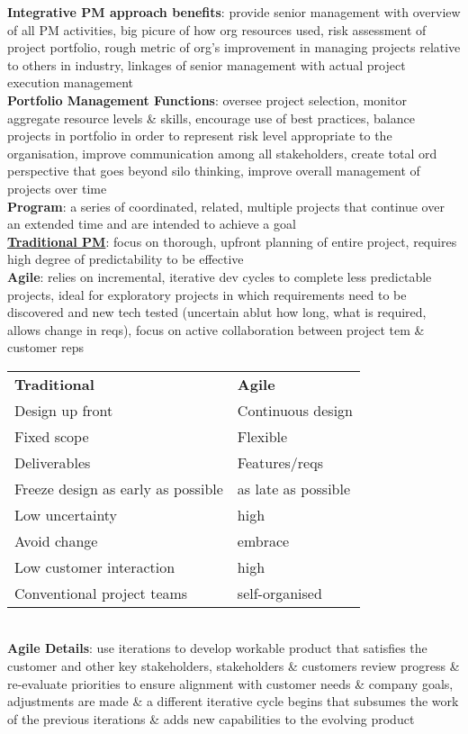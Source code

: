 \documentclass[a4paper]{article}
\begin{document}
\begin{multicols}{3}
        \textbf{Integrative PM approach benefits}: provide senior management with overview of all PM activities, big picure of how org resources used, risk assessment of project portfolio, rough metric of org's improvement in managing projects relative to others in industry, linkages of senior management with actual project execution management\\
        \textbf{Portfolio Management Functions}: oversee project selection, monitor aggregate resource levels \& skills, encourage use of best practices, balance projects in portfolio in order to represent risk level appropriate to the organisation, improve communication among all stakeholders, create total ord perspective that goes beyond silo thinking, improve overall management of projects over time\\
        \textbf{Program}: a series of coordinated, related, multiple projects that continue over an extended time and are intended to achieve a goal\\
        \underline{\textbf{Traditional PM}}: focus on thorough, upfront planning of entire project, requires high degree of predictability to be effective\\
        \textbf{Agile}: relies on incremental, iterative dev cycles to complete less predictable projects, ideal for exploratory projects in which requirements need to be discovered and new tech tested (uncertain ablut how long, what is required, allows change in reqs), focus on active collaboration between project tem \& customer reps\\
        \begin{tabular}{l l}
            \textbf{Traditional} & \textbf{Agile}\\
            Design up front & Continuous design\\
            Fixed scope & Flexible\\
            Deliverables & Features/reqs\\
            Freeze design as early as possible & as late as possible\\
            Low uncertainty & high\\
            Avoid change & embrace\\
            Low customer interaction & high\\
            Conventional project teams & self-organised\\
        \end{tabular}\\
        \textbf{Agile Details}: use iterations to develop workable product that satisfies the customer and other key stakeholders, stakeholders \& customers review progress \& re-evaluate priorities to ensure alignment with customer needs \& company goals, adjustments are made \& a different iterative cycle begins that subsumes the work of the previous iterations \& adds new capabilities to the evolving product\\

\end{multicols}
\end{document}
